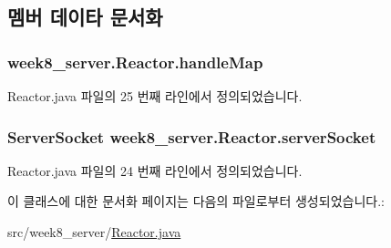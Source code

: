 \subsection{멤버 데이타 문서화}
\hypertarget{classweek8__server_1_1_reactor_a8ba93454e7dbe329e3fb503b94b5240e}{
\subsubsection[{handle\-Map}]{ week8\-\_\-server.\-Reactor.\-handle\-Map\hspace{0.3cm}{\ttfamily [private]}}}\label{classweek8__server_1_1_reactor_a8ba93454e7dbe329e3fb503b94b5240e}


Reactor.\-java 파일의 25 번째 라인에서 정의되었습니다.

\hypertarget{classweek8__server_1_1_reactor_a0ccdb32c43af4ff402db7cdf9991492b}{
\subsubsection[{server\-Socket}]{\setlength{\rightskip}{0pt plus 5cm}Server\-Socket week8\-\_\-server.\-Reactor.\-server\-Socket\hspace{0.3cm}{\ttfamily [private]}}}\label{classweek8__server_1_1_reactor_a0ccdb32c43af4ff402db7cdf9991492b}


Reactor.\-java 파일의 24 번째 라인에서 정의되었습니다.



이 클래스에 대한 문서화 페이지는 다음의 파일로부터 생성되었습니다.\-:\begin{DoxyCompactItemize}
\item 
src/week8\-\_\-server/\hyperlink{_reactor_8java}{Reactor.\-java}\end{DoxyCompactItemize}
